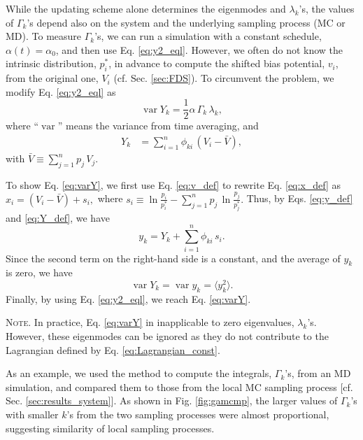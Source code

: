 \documentclass[reprint, floatfix]{revtex4-1}
\newcommand{\note}[1]{{\color{DarkGreen}\footnotesize \textsc{Note.} #1}}
\begin{document}
%
While the updating scheme alone
determines the eigenmodes and $\lambda_k$'s,
the values of $\Gamma_k$'s depend also on the system
and the underlying sampling process (MC or MD).
%
%
To measure $\Gamma_k$'s, we can run
a simulation with a constant schedule,
$\alpha(t) = \alpha_0$,
and then use Eq. \eqref{eq:y2_eql}.
%
However,
we often do not know the intrinsic distribution, $p^*_i$,
in advance to compute
the shifted bias potential, $v_i$,
from the original one, $V_i$
(cf. Sec. \ref{sec:FDS}).
%
To circumvent the problem, we
modify Eq. \eqref{eq:y2_eql} as
%
\begin{equation}
  \operatorname{var} Y_k
  =
  \frac{1}{2}
  \alpha \, \Gamma_k \, \lambda_k,
\label{eq:varY}
\end{equation}
%
where
``$\operatorname{var}$''
means the variance from time averaging,
and
%
\begin{align}
Y_k
&=
\sum_{ i = 1 }^n
  \phi_{k i} \, (V_i - \bar V),
\label{eq:Y_def}
\end{align}
%
with
$
\bar V
\equiv
\sum_{ j = 1 }^n p_j \, V_j.
$

To show Eq. \eqref{eq:varY},
we first use Eq. \eqref{eq:v_def}
to rewrite Eq. \eqref{eq:x_def}
as
$
  x_i
  =
  (V_i - \bar V) + s_i,
$
where
$
  s_i
  \equiv
  \ln \frac{ p_i } { p^*_i }
  -
  \sum_{ j = 1 }^n
    p_j \, \ln \frac{ p_j } { p^*_j }.
$
Thus, by Eqs. \eqref{eq:y_def} and \eqref{eq:Y_def},
we have
$$
y_k = Y_k + \sum_{i = 1}^n \phi_{k i} \, s_i.
$$
Since the second term on the right-hand side
is a constant, and the average of $y_k$ is zero,
we have
$$
\operatorname{var} Y_k
=
\operatorname{var} y_k
=
\langle y_k^2 \rangle.
$$
Finally, by using Eq. \eqref{eq:y2_eql},
we reach Eq. \eqref{eq:varY}.

\note{In practice, Eq. \eqref{eq:varY}
in inapplicable to zero eigenvalues, $\lambda_k$'s.
%
However, these eigenmodes can be ignored
as they do not contribute to the Lagrangian defined by
Eq. \eqref{eq:Lagrangian_const}.
}


As an example, we used the method to compute
the integrals, $\Gamma_k$'s, from an MD simulation,
and compared them to those from
the local MC sampling process
[cf. Sec. \ref{sec:results_system}].
%
As shown in Fig. \ref{fig:gamcmp},
the larger values of $\Gamma_k$'s
with smaller $k$'s
from the two sampling processes
were almost proportional,
suggesting similarity
of local sampling processes.
\end{document}
